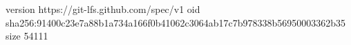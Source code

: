 version https://git-lfs.github.com/spec/v1
oid sha256:91400c23e7a88b1a734a166f0b41062c3064ab17c7b978338b56950003362b35
size 54111
